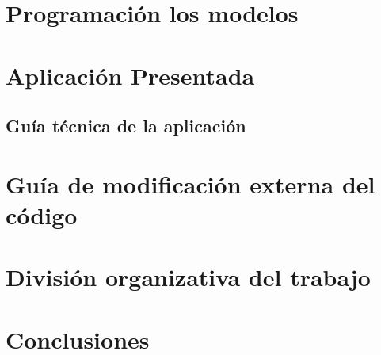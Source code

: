 \documentclass{llncs}
\begin{document}
\section{Programación los modelos}	



\section{Aplicación Presentada}


\subsection{Guía técnica de la aplicación}


\section{Guía de modificación externa del código}


\section{División organizativa del trabajo}


\section{Conclusiones}
\end{document}
